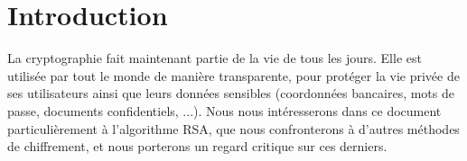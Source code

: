 \chapter*{Introduction}
La cryptographie fait maintenant partie de la vie de tous les jours. Elle est utilisée par tout le monde de manière transparente, pour protéger la vie privée de ses utilisateurs ainsi que leurs données sensibles (coordonnées bancaires, mots de passe, documents confidentiels, ...). Nous nous intéresserons dans ce document particulièrement à l'algorithme RSA, que nous confronterons à d'autres méthodes de chiffrement, et nous porterons un regard critique sur ces derniers.